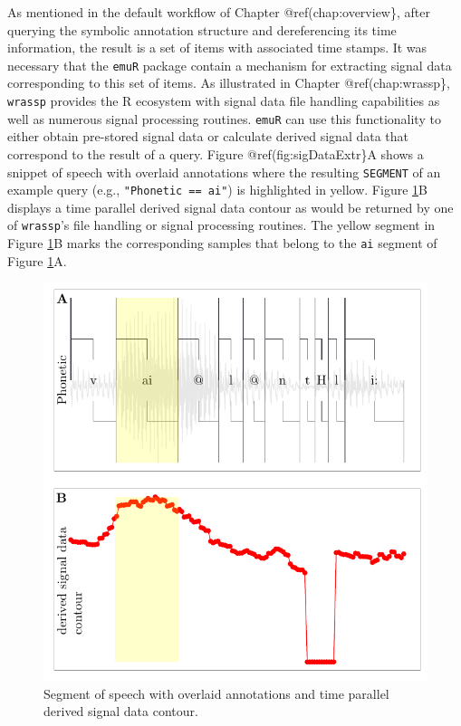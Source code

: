 \documentclass[]{book}
\theoremstyle{definition}
\theoremstyle{definition}
\theoremstyle{definition}
\theoremstyle{remark}
\begin{document}
As mentioned in the default workflow of Chapter @ref(chap:overview\},
after querying the symbolic annotation structure and dereferencing its
time information, the result is a set of items with associated time
stamps. It was necessary that the \texttt{emuR} package contain a
mechanism for extracting signal data corresponding to this set of items.
As illustrated in Chapter @ref(chap:wrassp\}, \texttt{wrassp} provides
the R ecosystem with signal data file handling capabilities as well as
numerous signal processing routines. \texttt{emuR} can use this
functionality to either obtain pre-stored signal data or calculate
derived signal data that correspond to the result of a query. Figure
@ref(fig:sigDataExtr\}A shows a snippet of speech with overlaid
annotations where the resulting \texttt{SEGMENT} of an example query
(e.g., \texttt{"Phonetic\ ==\ ai"}) is highlighted in yellow. Figure
\ref{fig:sigDataExtr}B displays a time parallel derived signal data
contour as would be returned by one of \texttt{wrassp}'s file handling
or signal processing routines. The yellow segment in Figure
\ref{fig:sigDataExtr}B marks the corresponding samples that belong to
the \texttt{ai} segment of Figure \ref{fig:sigDataExtr}A.

\begin{figure}

{\centering \includegraphics[width=0.75\linewidth]{pics/sigDataExtr} 

}

\caption{Segment of speech with overlaid annotations and time parallel derived signal data contour.}\label{fig:sigDataExtr}
\end{figure}
\end{document}

